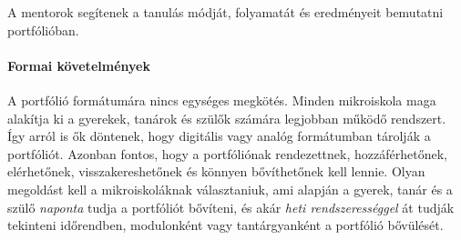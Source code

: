 A mentorok segítenek a tanulás módját, folyamatát és eredményeit bemutatni portfólióban.

\paragraph{Formai követelmények}
A portfólió formátumára nincs egységes megkötés. Minden mikroiskola maga alakítja ki a gyerekek, tanárok és szülők számára legjobban működő rendszert. Így arról is ők döntenek, hogy digitális vagy analóg formátumban tárolják a portfóliót. Azonban fontos, hogy a portfóliónak rendezettnek, hozzáférhetőnek, elérhetőnek, visszakereshetőnek és könnyen bővíthetőnek kell lennie. Olyan megoldást kell a mikroiskoláknak választaniuk, ami alapján
a gyerek, tanár és a szülő \emph{naponta} tudja a portfóliót bővíteni, és akár \emph{heti rendszerességgel} át tudják tekinteni időrendben, modulonként vagy tantárgyanként a portfólió bővülését.
